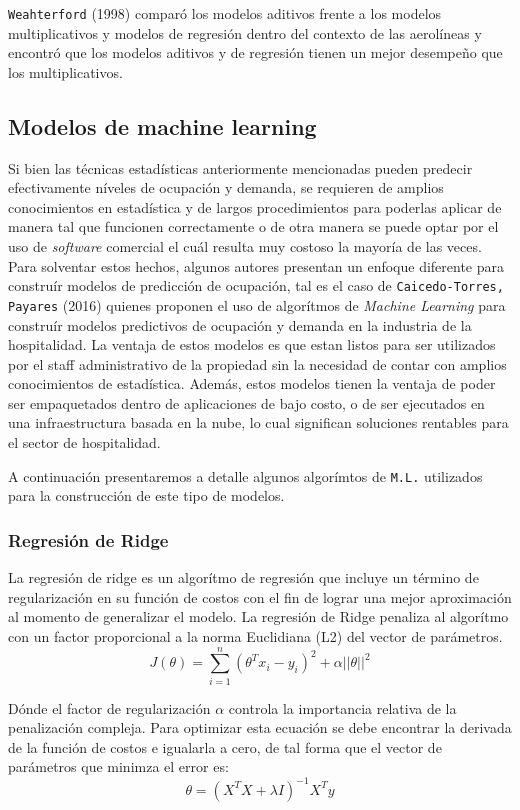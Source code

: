 {\texttt{Weahterford} (1998) comparó los modelos aditivos frente a los modelos multiplicativos y modelos de regresión dentro del contexto de las aerolíneas y encontró que los modelos aditivos y de regresión tienen un mejor desempeño que los multiplicativos.

\subsection*{Modelos de machine learning}

Si bien las técnicas estadísticas anteriormente mencionadas pueden predecir efectivamente níveles de ocupación y demanda, se requieren de amplios conocimientos en estadística y de largos procedimientos para poderlas aplicar de manera tal que funcionen correctamente o de otra manera se puede optar por el uso de \emph{software} comercial el cuál resulta muy costoso la mayoría de las veces. Para solventar estos hechos, algunos autores presentan un enfoque diferente para construír modelos de predicción de ocupación, tal es el caso de \texttt{Caicedo-Torres, Payares} (2016) quienes proponen el uso de algorítmos de \emph{Machine Learning} para construír modelos predictivos de ocupación y demanda en la industria de la hospitalidad. La ventaja de estos modelos es que estan listos para ser utilizados por el staff administrativo de la propiedad  sin la necesidad de contar con amplios conocimientos de estadística. Además, estos modelos tienen la ventaja de poder ser empaquetados dentro de aplicaciones de bajo costo, o de ser ejecutados en una infraestructura basada en la nube, lo cual significan soluciones rentables para el sector de hospitalidad.

A continuación presentaremos a detalle algunos algorímtos de \texttt{M.L.} utilizados para la construcción de este tipo de modelos.

\subsubsection*{Regresión de Ridge}

La regresión de ridge es un algorítmo de regresión que incluye un término de regularización en su función de costos con el fin de lograr una mejor aproximación al momento de generalizar el modelo. La regresión de Ridge penaliza al algorítmo con un factor proporcional a la norma Euclidiana (L2) del vector de parámetros. $$J(\theta)=\sum_{i=1}^{n} (\theta^Tx_i - y_i)^2 + \alpha||\theta||^2$$

Dónde el factor de regularización $\alpha$ controla la importancia relativa de la penalización compleja. Para optimizar esta ecuación se debe encontrar la derivada de la función de costos e igualarla a cero, de tal forma que el vector de parámetros que minimza el error es: $$\theta = (X^TX+\lambda I)^{-1} X^T y$$

}

